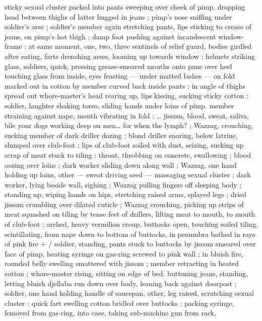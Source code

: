 sticky sexual cluster packed into pants sweeping over cheek of pimp. 
dropping head between thighs of latter hugged in jeans ; pimp's 
nose sniffing under soldier's arse ; soldier's member again 
stretching pants, lips sticking to crease of jeans, on pimp's hot thigh 
; damp foot pushing against incandescent window-frame : at same 
moment, one, two, three sentinels of relief guard, bodies girdled 
after eating, farts drenching arses, looming up towards window : 
helmets striking glass, soldiers, quick, pressing grease-smeared 
mouths onto pane over heel touching glass from inside, eyes 
feasting --- under matted lashes --- on fold marked out in cotton by 
member curved back inside pants ; in angle of thighs spread out 
whore-master's head rearing up, lips kissing, sucking sticky cotton : 
soldier, laughter shaking torso, sliding hands under loins of pimp. 
member straining against nape, mouth vibrating in fold : {\ldots} {\gl} jissom, 
blood, sweat, saliva, bile{\td} your dogs working deep on men{\ldots} for 
when the lymph?{\td} {\gr} ; Wazzag, crouching, sucking member of dark 
driller dozing ; blond driller snoring, below latrine, slumped over 
club-foot ; lips of club-foot soiled with dust, seizing, sucking up 
scrap of meat stuck to tiling : throat, throbbing on concrete, 
swallowing ; blood oozing over loins ; dark worker sliding down along 
wall ; Wazzag, one hand holding up loins, other --- sweat driving 
seed --- massaging sexual cluster ; dark worker, lying beside wall, 
sighing ; Wazzag pulling fingers off sleeping body ; standing up, 
wiping hands on hips, stretching raised arms, splayed legs ; dried 
jissom crumbling over dilated cuticle ; Wazzag crouching, picking up 
strips of meat squashed on tiling by tense feet of drillers, lifting 
meat to mouth, to mouth of club-foot ; arched, heavy vermilion 
croup, buttocks open, touching soiled tiling, scintillating, from nape 
down to bottom of buttocks, in penumbra bathed in rays of pink fire 
+ {\slash} soldier, standing, pants stuck to buttocks by jissom smeared over 
face of pimp, heating syringe on gas-ring screwed to pink wall ; in 
bluish fire, rounded belly swelling smattered with jissom ; member 
retracting in heated cotton ; whore-master rising, sitting on edge of 
bed. buttoning jeans, standing, letting bluish djellaba run down over 
body, leaning back against doorpost ; soldier, one hand holding 
handle of saucepan, other, leg raised, scratching sexual cluster : 
quick fart swelling cotton bridled over buttocks ; packing syringe, 
femoved from gas-ring, into case, taking sub-machine gun from rack, 

